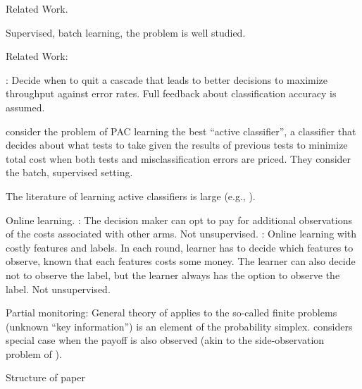 %
%

Related Work.

Supervised, batch learning, the problem is well studied.

Related Work: \cite{AISTATS13_SupervisedSequentialLearning_TrapezSaligram}

\cite{poczos2009}: Decide when to quit a cascade that leads to better decisions to maximize throughput against error rates. Full feedback about classification accuracy is assumed.

\citet{ActiveClass-AIJ-s} consider the problem of PAC learning the best ``active classifier'',
a classifier that decides about what tests to take given the results of previous tests
to minimize total cost when both tests and misclassification errors are priced.
They consider the batch, supervised setting. 

The literature of learning active classifiers is large 
(e.g., \citep{LCunderBudget-ECML05,ADORE-99,isukapalli01efficient-ICJAI}).


Online learning.
\cite{SBCA14:BanditsPaid}: The decision maker can opt to pay for additional observations of the costs associated with other arms. Not unsupervised.
\citet{ZBGGySz13:CostlyFeatures}: Online learning with costly features and labels.
In each round, learner has to decide which features to observe, known that each features costs 
some money. The learner can also decide not to observe the label, but the learner always has the option
to observe the label. Not unsupervised.

Partial monitoring:
General theory of \citet{BaFoPaRaSze14} 
applies to the so-called finite problems (unknown ``key information'') is an element of the probability simplex.
\citet{AgTeAn89:pmon} considers special case when the payoff is also observed (akin to the side-observation problem of \citet{MaSh11}).

Structure of paper
